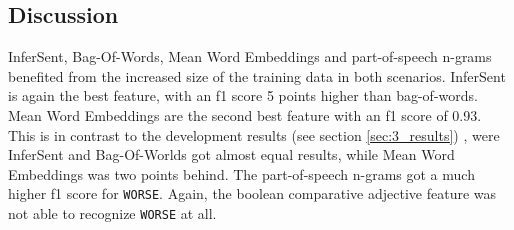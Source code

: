 \subsection{Discussion}
InferSent, Bag-Of-Words, Mean Word Embeddings and part-of-speech n-grams benefited from the increased size of the training data in both scenarios. InferSent is again the best feature, with an f1 score 5 points higher than bag-of-words. Mean Word Embeddings are the second best feature with an f1 score of 0.93. This is in contrast to the development results (see section \ref{sec:3_results}) , were InferSent and Bag-Of-Worlds got almost equal results, while Mean Word Embeddings was two points behind. The part-of-speech n-grams got a much higher f1 score for \texttt{WORSE}. Again, the boolean comparative adjective feature was not able to recognize \texttt{WORSE} at all.
